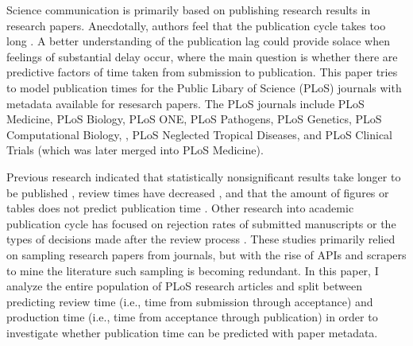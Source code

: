 Science communication is primarily based on publishing research results in research papers. Anecdotally, authors feel that the publication cycle takes too long \cite{Himmelstein2015-me}. A better understanding of the publication lag could provide solace when feelings of substantial delay occur, where the main question is whether there are predictive factors of time taken from submission to publication. This paper tries to model publication times for the Public Libary of Science (PLoS) journals with metadata available for resesarch papers. The PLoS journals include PLoS Medicine, PLoS Biology, PLoS ONE, PLoS Pathogens, PLoS Genetics, PLoS Computational Biology, , PLoS Neglected Tropical Diseases, and PLoS Clinical Trials (which was later merged into PLoS Medicine).

Previous research indicated that statistically nonsignificant results take longer to be published \cite{ioannidis1998}, review times have decreased \cite{lyman2013}, and that the amount of figures or tables does not predict publication time \cite{lee2013}. Other research into academic publication cycle has focused on rejection rates of submitted manuscripts or the types of decisions made after the review process \cite{Rosenkrantz2015-uj}. These studies primarily relied on sampling research papers from journals, but with the rise of APIs and scrapers to mine the literature \cite[e.g.,][]{Smith-Unna2014-cd} such sampling is becoming redundant. In this paper, I analyze the entire population of PLoS research articles and split between predicting review time (i.e., time from submission through acceptance) and production time (i.e., time from acceptance through publication) in order to investigate whether publication time can be predicted with paper metadata. 
  
  